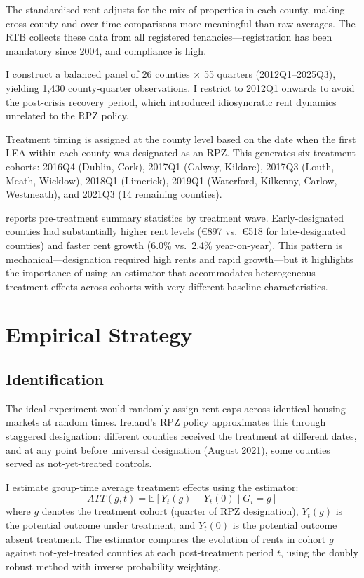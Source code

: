 \documentclass[12pt]{article}
\newcommand{\E}{\mathbb{E}}
\begin{document}
The standardised rent adjusts for the mix of properties in each county, making cross-county and over-time comparisons more meaningful than raw averages. The RTB collects these data from all registered tenancies---registration has been mandatory since 2004, and compliance is high.

I construct a balanced panel of 26 counties $\times$ 55 quarters (2012Q1--2025Q3), yielding 1,430 county-quarter observations. I restrict to 2012Q1 onwards to avoid the post-crisis recovery period, which introduced idiosyncratic rent dynamics unrelated to the RPZ policy.

Treatment timing is assigned at the county level based on the date when the first LEA within each county was designated as an RPZ. This generates six treatment cohorts: 2016Q4 (Dublin, Cork), 2017Q1 (Galway, Kildare), 2017Q3 (Louth, Meath, Wicklow), 2018Q1 (Limerick), 2019Q1 (Waterford, Kilkenny, Carlow, Westmeath), and 2021Q3 (14 remaining counties).

 reports pre-treatment summary statistics by treatment wave. Early-designated counties had substantially higher rent levels (\euro{897} vs.\ \euro{518} for late-designated counties) and faster rent growth (6.0\% vs.\ 2.4\% year-on-year). This pattern is mechanical---designation required high rents and rapid growth---but it highlights the importance of using an estimator that accommodates heterogeneous treatment effects across cohorts with very different baseline characteristics.





\section{Empirical Strategy}
\label{sec:strategy}

\subsection{Identification}

The ideal experiment would randomly assign rent caps across identical housing markets at random times. Ireland's RPZ policy approximates this through staggered designation: different counties received the treatment at different dates, and at any point before universal designation (August 2021), some counties served as not-yet-treated controls.

I estimate group-time average treatment effects using the \citet{callaway2021} estimator:
\begin{equation}
ATT(g,t) = \E[Y_t(g) - Y_t(0) \mid G_i = g]
\label{eq:cs}
\end{equation}
where $g$ denotes the treatment cohort (quarter of RPZ designation), $Y_t(g)$ is the potential outcome under treatment, and $Y_t(0)$ is the potential outcome absent treatment. The estimator compares the evolution of rents in cohort $g$ against not-yet-treated counties at each post-treatment period $t$, using the doubly robust method with inverse probability weighting.
\end{document}
